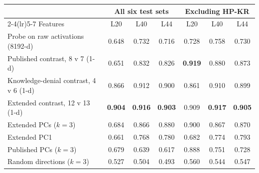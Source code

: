 \begin{tabular}{lcccccc}
\toprule
 & \multicolumn{3}{c}{All six test sets} & \multicolumn{3}{c}{Excluding HP-KR} \\
\cmidrule(lr){2-4}\cmidrule(lr){5-7}
Features & L20 & L40 & L44 & L20 & L40 & L44 \\
\midrule
Probe on raw activations (8192-d) & 0.648 & 0.732 & 0.716 & 0.728 & 0.758 & 0.730 \\
\midrule
Published contrast, 8 v 7 (1-d) & 0.651 & 0.832 & 0.826 & \textbf{0.919} & 0.880 & 0.873 \\
Knowledge-denial contrast, 4 v 6 (1-d) & 0.866 & 0.912 & 0.900 & 0.861 & 0.910 & 0.899 \\
Extended contrast, 12 v 13 (1-d) & \textbf{0.904} & \textbf{0.916} & \textbf{0.903} & 0.909 & \textbf{0.917} & \textbf{0.905} \\
\midrule
Extended PCs ($k=3$) & 0.684 & 0.866 & 0.880 & 0.900 & 0.867 & 0.870 \\
Extended PC1 & 0.661 & 0.768 & 0.780 & 0.682 & 0.774 & 0.793 \\
Published PCs ($k=3$) & 0.679 & 0.639 & 0.617 & 0.888 & 0.751 & 0.728 \\
Random directions ($k=3$) & 0.527 & 0.504 & 0.493 & 0.560 & 0.544 & 0.547 \\
\bottomrule
\end{tabular}